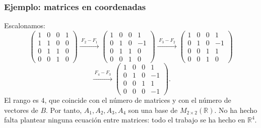\begin{frame}
    \frametitle{Ejemplo: matrices en coordenadas}

    \begin{example}
        Escalonamos:
        \vspace{-1ex}
        \[
            \begin{pmatrix}
                1&0&0&1\\
                1&1&0&0\\
                0&1&1&0\\
                0&0&1&0
            \end{pmatrix}
            \xrightarrow{\;F_2-F_1\;}
            \begin{pmatrix}
                1&0&0&1\\
                0&1&0&-1\\
                0&1&1&0\\
                0&0&1&0
            \end{pmatrix}
            \xrightarrow{\;F_3-F_2\;}
            \begin{pmatrix}
                1&0&0&1\\
                0&1&0&-1\\
                0&0&1&1\\
                0&0&1&0
            \end{pmatrix}
        \]
        \[
            \xrightarrow{\;F_4-F_3\;}
            \begin{pmatrix}
                1&0&0&1\\
                0&1&0&-1\\
                0&0&1&1\\
                0&0&0&-1
            \end{pmatrix}.
        \]
        El rango es \(4\), que coincide con el número de matrices y con el
        número de vectores de \(B\). Por tanto, \(A_1,A_2,A_3,A_4\) son
        una \alert{base} de \(M_{2\times2}(\mathbb{R})\).
        No ha hecho falta plantear ninguna ecuación entre matrices:
        todo el trabajo se ha hecho en \(\mathbb{R}^4\).
    \end{example}
\end{frame}


